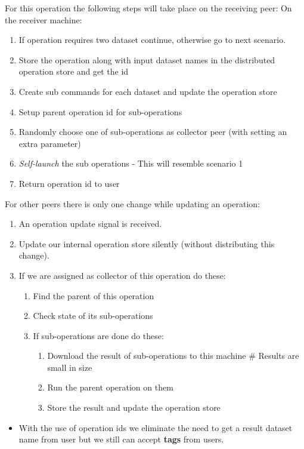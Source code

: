 For this operation the following steps will take place on the receiving peer:
On the receiver machine:
\begin{enumerate}
\item If operation requires two dataset continue, otherwise go to next scenario.
\item Store the operation along with input dataset names in the distributed operation store and get the id
\item Create sub commands for each dataset and update the operation store
\item Setup parent operation id for sub-operations
\item Randomly choose one of sub-operations as collector peer (with setting an extra parameter)
\item \textit{Self-launch} the sub operations - This will resemble scenario 1
\item Return operation id to user
\end{enumerate}


For other peers there is only one change while updating an operation:
\begin{enumerate}
\item An operation update signal is received.
\item Update our internal operation store silently (without distributing this change).
\item If we are assigned as collector of this operation do these:
  \begin{enumerate}
  \item Find the parent of this operation
  \item Check state of its sub-operations
  \item If sub-operations are done do these:
    \begin{enumerate}
    \item Download the result of sub-operations to this machine \# Results are small in size
    \item Run the parent operation on them
    \item Store the result and update the operation store
    \end{enumerate}
  \end{enumerate}
\end{enumerate}

\begin{itemize}
\item With the use of operation ids we eliminate the need to get a 
result dataset name from user but we still can accept \textbf{tags} from users.
\end{itemize}

